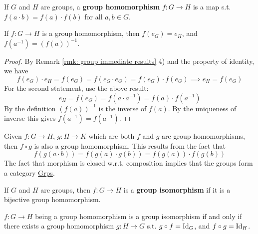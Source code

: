 \documentclass{article}
\begin{document}
\begin{definition}
    If $G$ and $H$ are groups, a \textbf{group homomorphism} $f: G \to H$ is a map s.t. $f(a\cdot b) = f(a) \cdot f(b)$ for all $a, b \in G$. 
\end{definition}

\begin{proposition}\label{prop: grp homo preserve identity and inverse}
    If $f: G \to H$ is a group homomorphism, then $f(e_G) = e_H$, and $f(a^{-1}) = (f(a))^{-1}$.
\end{proposition}

\begin{proof}
    By Remark \ref{rmk: group immediate results} 4) and the property of identity, we have
    \[
        f(e_G) \cdot e_H = f(e_G) = f(e_G \cdot e_G) = f(e_G) \cdot f(e_G) \implies e_H = f(e_G)
    \]
    For the second statement, use the above result:
    \[
        e_H = f(e_G) = f(a \cdot a^{-1}) = f(a) \cdot f(a^{-1})
    \]
    By the definition $(f(a))^{-1}$ is the inverse of $f(a)$. By the uniqueness of inverse this gives $f(a^{-1}) = f(a^{-1})$.
\end{proof}

\begin{remark}
    Given $f: G \to H$, $g: H \to K$ which are both $f$ and $g$ are group homomorphisms, then $f \circ g$ is also a group homomorphism. This results from the fact that
    \[
        f(g(a \cdot b)) = f(g(a) \cdot g(b)) = f(g(a)) \cdot f(g(b))
    \]
    The fact that morphism is closed w.r.t. composition implies that the groups form a category \underline{Grps}.
\end{remark}

\begin{definition}
    If $G$ and $H$ are groups, then $f: G \to H$ is a \textbf{group isomorphism} if it is a bijective group homomorphism.
\end{definition}

\begin{proposition}\label{prop: categorical def of group isomorphism}
    $f: G \to H$ being a group homomorphism is a group isomorphism if and only if there exists a group homomorphism $g: H \to G$ s.t. $g \circ f = \mathrm{Id}_G$, and $f \circ g = \mathrm{Id}_H$.
\end{proposition}
\end{document}
